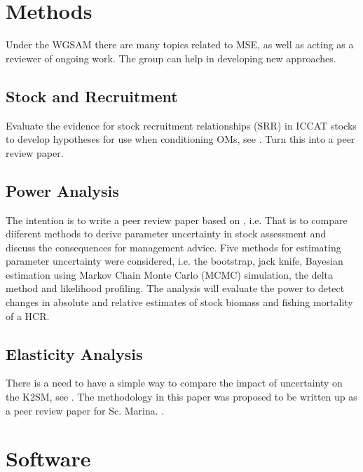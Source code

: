 \documentclass[a4paper,10pt]{article}
\begin{document}
\section{Methods}

Under the WGSAM there are many topics related to MSE, as well as acting as a reviewer of ongoing work. The group can help in developing new approaches.


\subsection{Stock and Recruitment}

Evaluate the evidence for stock recruitment relationships (SRR) in ICCAT stocks to develop hypotheses 
for use when conditioning OMs, see . Turn this into a peer review paper.

\subsection{Power Analysis}

The intention is to write a peer review paper based on , i.e.  That is to compare diiferent methods to 
derive parameter uncertainty in stock assessment and discuss the consequences for management advice.
Five methods for estimating parameter uncertainty were considered, i.e. the bootstrap, jack knife, Bayesian estimation using Markov 
Chain Monte Carlo (MCMC) simulation, the delta method and likelihood profiling.
The analysis will evaluate the power to detect changes in absolute and relative estimates of stock biomass and fishing mortality
of a HCR. 

\subsection{Elasticity Analysis}

There is a need to have a simple way to compare the impact of uncertainty on the K2SM, see .
The methodology in this paper was proposed to be written up as a peer review paper for Sc. Marina. .

\newpage\clearpage
\section{Software}
\end{document}
